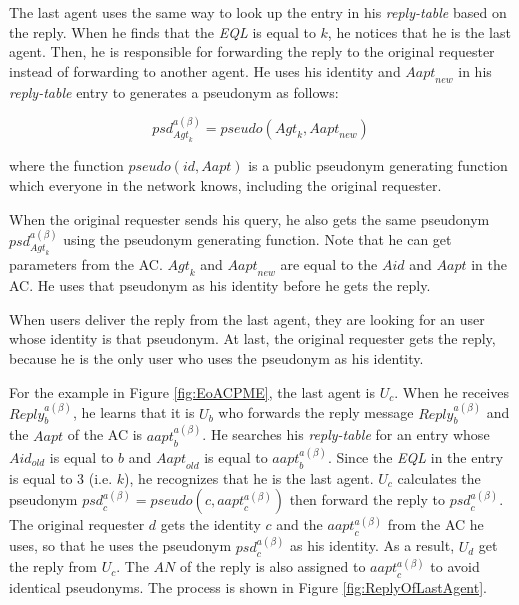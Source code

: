 The last agent uses the same way to look up the entry in his \textit{reply-table} based on the reply. When he finds that the \textit{EQL} is equal to $k$, he notices that he is the last agent. Then, he is responsible for forwarding the reply to the original requester instead of forwarding to another agent. He uses his identity and ${Aapt}_{new}$ in his \textit{reply-table} entry to generates a pseudonym as follows:

\begin{equation} \label{GrindEQ__ACPPsd} 
{psd}_{{Agt}_k}^{a\left( \beta \right)}=pseudo\left({Agt}_k,{Aapt}_{new}\right)
\end{equation}

where the function $pseudo\left(id,Aapt\right)$ is a public pseudonym generating function which everyone in the network knows, including the original requester.

When the original requester sends his query, he also gets the same pseudonym ${psd}_{{Agt}_k}^{a\left( \beta \right)}$ using the pseudonym generating function. Note that he can get parameters from the AC. ${Agt}_k$ and ${Aapt}_{new}$ are equal to the $Aid$ and $Aapt$ in the AC. He uses that pseudonym as his identity before he gets the reply.

When users deliver the reply from the last agent, they are looking for an user whose identity is that pseudonym. At last, the original requester gets the reply, because he is the only user who uses the pseudonym as his identity.

For the example in Figure \ref{fig:EoACPME}, the last agent is $U_c$. When he receives ${Reply}^{a\left(\beta\right)}_b$, he learns that it is $U_b$ who forwards the reply message ${Reply}^{a\left(\beta\right)}_b$ and the $Aapt$ of the AC is ${aapt}^{a\left(\beta\right)}_b$. He searches his \textit{reply-table} for an entry whose ${Aid}_{old}$ is equal to $b$ and ${Aapt}_{old}$ is equal to ${aapt}^{a\left(\beta\right)}_b$. Since the \textit{EQL} in the entry is equal to 3 (i.e. $k$), he recognizes that he is the last agent. $U_c$ calculates the pseudonym ${psd}^{a\left(\beta \right)}_c=pseudo\left(c,{aapt}^{a\left(\beta\right)}_c\right)$ then forward the reply to ${psd}^{a\left(\beta\right)}_c$. The original requester $d$ gets the identity $c$ and the ${aapt}^{a\left(\beta \right)}_c$ from the AC he uses, so that he uses the pseudonym ${psd}^{a\left(\beta \right)}_c$ as his identity. As a result, $U_d$ get the reply from $U_c$. The $AN$ of the reply is also assigned to ${aapt}^{a\left(\beta\right)}_c$ to avoid identical pseudonyms. The process is shown in Figure \ref{fig:ReplyOfLastAgent}. 

